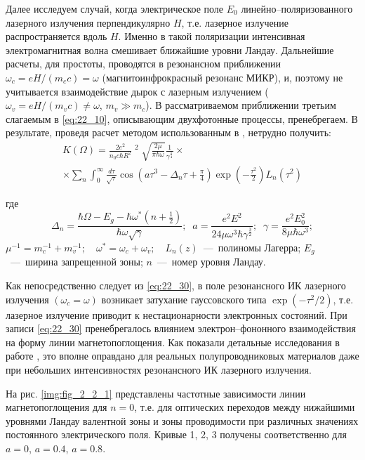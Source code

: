 {Далее исследуем случай, когда электрическое поле $E_{0} $ линейно--поляризованного лазерного излучения перпендикулярно $H$, т.е. лазерное излучение распространяется вдоль $H$. Именно в такой поляризации интенсивная электромагнитная волна смешивает ближайшие уровни Ландау. Дальнейшие расчеты, для простоты, проводятся в резонансном приближении $\omega _{c} =eH/(m_{c} c)=\omega $ (магнитоинфрокрасный резонанс МИКР), и, поэтому не учитывается взаимодействие дырок с лазерным излучением ($\omega _{v} =eH/(m_{v} c)\ne \omega $, $m_{v} \gg m_{c} $). В рассматриваемом приближении третьим слагаемым в \eqref{eq:22_10}, описывающим двухфотонные процессы, пренебрегаем. В результате, проведя расчет методом использованным в \cite{Sinyavskii1974,Sinyavskii2002}, нетрудно получить: 
\begin{multline} \label{eq:22_30} 
K(\Omega )=\frac{2e^{2} }{n_{0} c\hbar R^{2} } \mathop{\left|\frac{p_{cv} \xi _{0} }{m_{0} } \right|}\nolimits^{2} \sqrt{\frac{2\mu }{\pi \hbar \omega } } \frac{1}{\gamma ^{{\tfrac{1}{4}} } } \times \\
\times \sum _{n} \int _{0}^{\infty } \frac{d\tau }{\sqrt{\tau } } \cos \left(a\tau ^{3} -\Delta _{n} \tau +\frac{\pi }{4} \right)\exp \left(-\frac{\tau ^{2} }{2} \right)L_{n} (\tau ^{2} )
\end{multline} 

где 
\[
\Delta _{n} =\frac{\hbar \Omega -E_{g} -\hbar \omega ^{*} \left(n+{\tfrac{1}{2}} \right)}{\hbar \omega \sqrt{\gamma } } ;\; \; a=\frac{e^{2} E^{2} }{24\mu \omega ^{3} \hbar \gamma ^{{\tfrac{3}{2}} } } ;\; \; \gamma =\frac{e^{2} E_{0}^{2} }{8\mu \hbar \omega ^{3} } ;
\] 
$\mu ^{-1} =m_{c}^{-1} +m_{v}^{-1} ;$~~$\omega ^{*} =\omega _{c} +\omega _{v} ;$~~$L_{n} (z)$~---~полиномы Лагерра; $E_{g} $~---~ширина запрещенной зоны; $n$~---~номер уровня Ландау. 

\noindent Как непосредственно следует из \eqref{eq:22_30}, в поле резонансного ИК лазерного излучения $(\omega _{c} =\omega )$ возникает затухание гауссовского типа $\exp \left(-\tau ^{2} /2\right)$, т.е. лазерное излучение приводит к нестационарности электронных состояний. При записи \eqref{eq:22_30} пренебрегалось влиянием электрон--фононного взаимодействия на форму линии магнетопоглощения. Как показали детальные исследования в работе \cite{Sinyavskii1976}, это вполне оправдано для реальных полупроводниковых материалов даже при небольших интенсивностях резонансного ИК лазерного излучения. 

На рис. \ref{img:fig_2_2_1} представлены частотные зависимости линии магнетопоглощения для $n=0$, т.е. для оптических переходов между нижайшими уровнями Ландау валентной зоны и зоны проводимости при различных значениях постоянного электрического поля. Кривые 1, 2, 3 получены соответственно для $a=0$, $a=0.4$, $a=0.8$.

}
